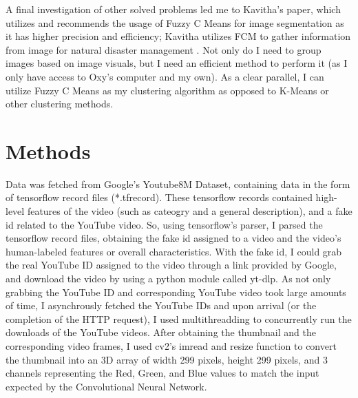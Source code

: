 \documentclass[10pt,twocolumn]{article}
\begin{document}
A final investigation of other solved problems led me to Kavitha's paper, which utilizes and recommends the usage of Fuzzy C Means for image segmentation as it has higher precision and efficiency; Kavitha utilizes FCM to gather information from image for natural disaster management \cite{Kavitha2020}. Not only do I need to group images based on image visuals, but I need an efficient method to perform it (as I only have access to Oxy's computer and my own). As a clear parallel, I can utilize Fuzzy C Means as my clustering algorithm as opposed to K-Means or other clustering methods.


\section {Methods}

Data was fetched from Google's Youtube8M Dataset, containing data in the form of tensorflow record files (*.tfrecord). These tensorflow records contained high-level features of the video (such as cateogry and a general description), and a fake id related to the YouTube video. So, using tensorflow's parser, I parsed the tensorflow record files, obtaining the fake id assigned to a video and the video's human-labeled features or overall characteristics. With the fake id, I could grab the real YouTube ID assigned to the video through a link provided by Google, and download the video by using a python module called yt-dlp. As not only grabbing the YouTube ID and corresponding YouTube video took large amounts of time, I asynchrously fetched the YouTube IDs and upon arrival (or the completion of the HTTP request), I used multithreadding to concurrently run the downloads of the YouTube videos. After obtaining the thumbnail and the corresponding video frames, I used cv2's imread and resize function to convert the thumbnail into an 3D array of width 299 pixels, height 299 pixels, and 3 channels representing the Red, Green, and Blue values to match the input expected by the Convolutional Neural Network. 
\end{document}
